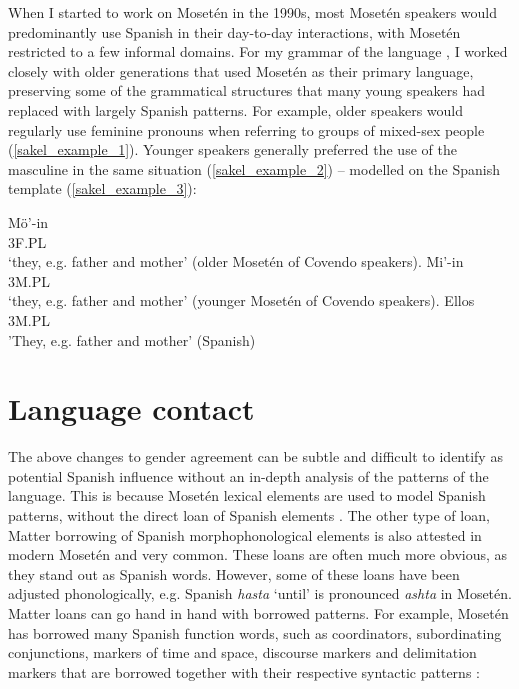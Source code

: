 \documentclass[output=paper,colorlinks,citecolor=brown
]{langscibook}
\begin{document}
When I started to work on Mosetén in the 1990s, most Mosetén speakers would predominantly use Spanish in their day-to-day interactions, with Mosetén restricted to a few informal domains. For my grammar of the language \citep{sakel2004grammar}, I worked closely with older generations that used Mosetén as their primary language, preserving some of the grammatical structures that many young speakers had replaced with largely Spanish patterns. For example, older speakers would regularly use feminine pronouns when referring to groups of mixed-sex people (\ref{sakel_example_1}). Younger speakers generally preferred the use of the masculine in the same situation (\ref{sakel_example_2}) – modelled on the Spanish template (\ref{sakel_example_3}):

\ea \label{sakel_example_1}
\gll Mö'-in\\
     3F.\textsc{PL}\\
\glt `they, e.g. father and mother' (older Mosetén of Covendo speakers).
\z
\ea \label{sakel_example_2}
\gll Mi'-in\\
     3M.\textsc{PL}\\
\glt `they, e.g. father and mother' (younger Mosetén of Covendo speakers).
\z
\ea \label{sakel_example_3}
\gll Ellos\\
     3M.PL\\
\glt 'They, e.g. father and mother' (Spanish)
\z


\section{Language contact}
The above changes to gender agreement can be subtle and difficult to identify as potential Spanish influence without an in-depth analysis of the patterns of the language. This is because Mosetén lexical elements are used to model Spanish patterns, without the direct loan of Spanish elements \citep{matras2007grammatical}\citep{matras2007investigating}. The other type of loan, Matter borrowing of Spanish morphophonological elements is also attested in modern Mosetén and very common. These loans are often much more obvious, as they stand out as Spanish words. However, some of these loans have been adjusted phonologically, e.g. Spanish \textit{hasta} ‘until’ is pronounced \textit{ashta} in Mosetén. Matter loans can go hand in hand with borrowed patterns. For example, Mosetén has borrowed many Spanish function words, such as coordinators, subordinating conjunctions, markers of time and space, discourse markers and delimitation markers that are borrowed together with their respective syntactic patterns \citep{sakel2007language}\citep{sakel2007moseten}:
\end{document}
